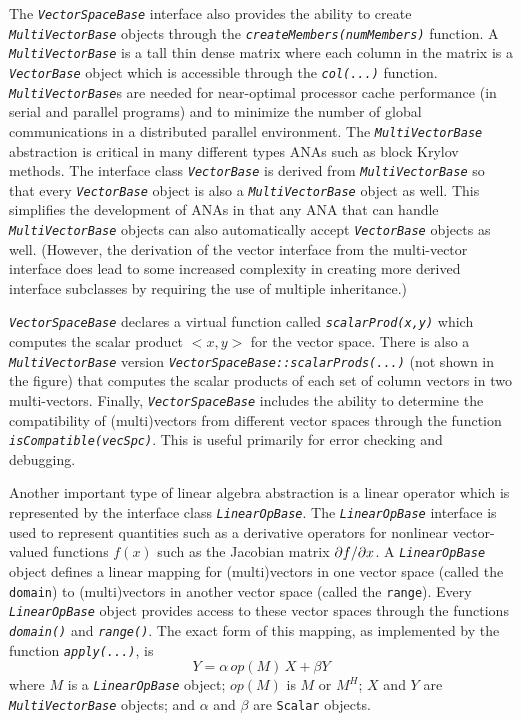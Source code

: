 \documentclass[11pt]{SANDreport}
\begin{document}
The \texttt{\textit{Vector\-Space\-Base}} interface also provides the ability to create \texttt{\textit{Multi\-Vector\-Base}} objects through the \texttt{\textit{createMembers(numMembers)}} function.  A \texttt{\textit{Multi\-Vector\-Base}} is a tall thin dense matrix where each column in the matrix is a \texttt{\textit{Vector\-Base}} object which is accessible through the \texttt{\textit{col(...)}}  function.  \texttt{\textit{Multi\-Vector\-Base}}s are needed for near-optimal processor cache performance (in serial and parallel programs) and to minimize the number of global communications in a distributed parallel environment.  The \texttt{\textit{Multi\-Vector\-Base}} abstraction is critical in many different types ANAs such as block Krylov methods.  The interface class \texttt{\textit{Vector\-Base}} is derived from \texttt{\textit{Multi\-Vector\-Base}} so that every \texttt{\textit{Vector\-Base}} object is also a \texttt{\textit{Multi\-Vector\-Base}} object as well.  This simplifies the development of ANAs in that any ANA that can handle \texttt{\textit{Multi\-Vector\-Base}} objects can also automatically accept \texttt{\textit{Vector\-Base}} objects as well. (However, the derivation of the vector interface from the multi-vector interface does lead to some increased complexity in creating more derived interface subclasses by requiring the use of multiple inheritance.)

\texttt{\textit{Vector\-Space\-Base}} declares a virtual function called \texttt{\textit{scalarProd(x,y)}} which computes the scalar product $<x,y>$ for the vector space.  There is also a \texttt{\textit{Multi\-Vector\-Base}} version \texttt{\textit{Vector\-Space\-Base\-::scalarProds(...)}}  (not shown in the figure) that computes the scalar products of each set of column vectors in two multi-vectors.  Finally, \texttt{\textit{Vector\-Space\-Base}} includes the ability to determine the compatibility of (multi)vectors from different vector spaces through the function \texttt{\textit{isCompatible(vecSpc)}}. This is useful primarily for error checking and debugging.

Another important type of linear algebra abstraction is a linear operator which is represented by the interface class \texttt{\textit{Linear\-Op\-Base}}.  The \texttt{\textit{Linear\-Op\-Base}} interface is used to represent quantities such as a derivative operators for nonlinear vector-valued functions $f(x)$ such as the Jacobian matrix $\partial f / \partial x$. A \texttt{\textit{Linear\-Op\-Base}} object defines a linear mapping for (multi)vectors in one vector space (called the \texttt{domain}) to (multi)vectors in another vector space (called the \texttt{range}).  Every \texttt{\textit{Linear\-Op\-Base}} object provides access to these vector spaces through the functions \texttt{\textit{domain()}} and \texttt{\textit{range()}}.  The exact form of this mapping, as implemented by the function \texttt{\textit{apply(\-...)}}, is
%
\begin{equation}
Y = \alpha \, op(M) \, X + \beta Y
\label{thyra:equ:apply_vec}
\end{equation}
%
where $M$ is a \texttt{\textit{Linear\-Op\-Base}} object; $op(M)$ is $M$ or $M^H$; $X$ and $Y$ are \texttt{\textit{Multi\-Vector\-Base}} objects; and $\alpha$ and $\beta$ are \texttt{Scalar} objects.
\end{document}
